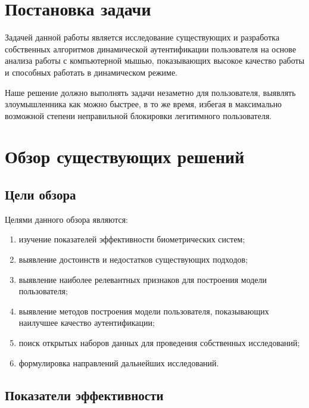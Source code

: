 \documentclass[12pt]{article}
\begin{document}
    \section{Постановка задачи}
    \label{sec:FormulationOfProblem}

    \par Задачей данной работы является исследование существующих и разработка собственных алгоритмов динамической аутентификации пользователя на основе анализа работы с компьютерной мышью, показывающих высокое качество работы и способных работать в динамическом режиме.

    \par Наше решение должно выполнять задачи незаметно для пользователя, выявлять злоумышленника как можно быстрее, в то же время, избегая в максимально возможной степени неправильной блокировки легитимного пользователя.

    \newpage



    \section{Обзор существующих решений}
    \label{sec:Overview}

    \subsection{Цели обзора}
    \label{sec:Overview:Goals}

    \par Целями данного обзора являются:

    \begin{enumerate}
        \item изучение показателей эффективности биометрических систем;
        \item выявление достоинств и недостатков существующих подходов;
        \item выявление наиболее релевантных признаков для построения модели пользователя;
        \item выявление методов построения модели пользователя, показывающих наилучшее качество аутентификации;
        \item поиск открытых наборов данных для проведения собственных исследований;
        \item формулировка направлений дальнейших исследований.
    \end{enumerate}


    \subsection{Показатели эффективности}
    \label{sec:Overview:Metrics}
\end{document}
